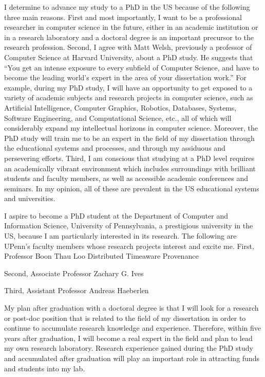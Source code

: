 \documentclass[a4paper,10pt]{report}
\newcommand{\university}{University of Pennsylvania}
\newcommand{\department}{Department of Computer and Information Science}
\newcommand{\uniabbre}{UPenn}
\begin{document}
\vspace{0.2cm}
I determine to advance my study to a PhD in the US because of the following three main reasons. First and most importantly, I want to be a professional researcher in computer science in the future, either in an academic institution or in a research laboratory and a doctoral degree is an important precursor to the research profession. Second, I agree with Matt Welsh, previously a professor of Computer Science at Harvard University, about a PhD study. He suggests that ``You get an intense exposure to every subfield of Computer Science, and have to become the leading world's expert in the area of your dissertation work.'' For example, during my PhD study, I will have an opportunity to get exposed to a variety of academic subjects and research projects in computer science, such as Artificial Intelligence, Computer Graphics, Robotics, Databases, Systems, Software Engineering, and Computational Science, etc., all of which will considerably expand my intellectual horizons in computer science. Moreover, the PhD study will train me to be an expert in the field of my dissertation through the educational systems and processes, and through my assiduous and persevering efforts. Third, I am conscious that studying at a PhD level requires an academically vibrant environment which includes surroundings with brilliant students and faculty members, as well as accessible academic conferences and seminars. In my opinion, all of these are prevalent in the US educational systems and universities.

\vspace{0.2cm}
I aspire to become a PhD student at the \department, \university, a prestigious university in the US, because I am particularly interested in its research. The following are \uniabbre's faculty members whose research projects interest and excite me. First, Professor Boon Thau Loo Distributed Timeaware Provenance

\vspace{0.2cm}
Second, Associate Professor Zachary G. Ives

\vspace{0.2cm}
Third, Assistant Professor Andreas Haeberlen

\vspace{0.2cm}
My plan after graduation with a doctoral degree is that I will look for a research or post-doc position that is related to the field of my dissertation in order to continue to accumulate research knowledge and experience. Therefore, within five years after graduation, I will become a real expert in the field and plan to lead my own research laboratory. Research experience gained during the PhD study and accumulated after graduation will play an important role in attracting funds and students into my lab.
\end{document}

